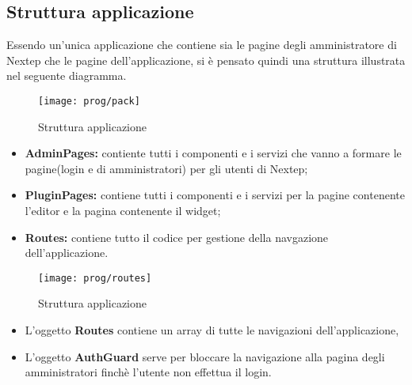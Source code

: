 \subsection{Struttura applicazione}
Essendo un'unica applicazione che contiene sia le pagine degli amministratore di Nextep che le pagine dell'applicazione, si è pensato quindi una struttura illustrata nel seguente diagramma.
\begin{figure}[!h] 
	\centering 
	\texttt{[image: prog/pack]} 
	\caption{Struttura applicazione}
\end{figure}
\begin{itemize}
	\item \textbf{AdminPages:} contiente tutti i componenti e i servizi che vanno a formare le pagine(login e di amministratori) per gli utenti di Nextep;
	\item \textbf{PluginPages:} contiene tutti i componenti e i servizi per la pagine contenente l'editor e la pagina contenente il widget;
	\item \textbf{Routes:} contiene tutto il codice per gestione della navgazione dell'applicazione.
\end{itemize}
\begin{figure}[!h] 
	\centering 
	\texttt{[image: prog/routes]} 
	\caption{Struttura applicazione}
\end{figure}
\begin{itemize}
	\item L'oggetto \textbf{Routes} contiene un array di tutte le navigazioni dell'applicazione,
	\item L'oggetto \textbf{AuthGuard} serve per bloccare la navigazione alla pagina degli amministratori finchè l'utente non effettua il login. 
	\\
\end{itemize}
